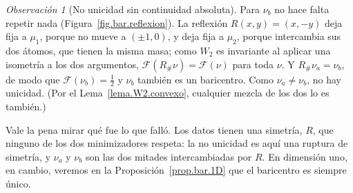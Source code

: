 \documentclass[12pt, a4paper]{amsbook}
\theoremstyle{remark}
\newtheorem{obs}[teo]{Observación}
\theoremstyle{definition}
\numberwithin{section}{chapter}
\numberwithin{subsection}{section}
\numberwithin{equation}{section}
\numberwithin{figure}{chapter}
\begin{document}
\begin{obs}[No unicidad sin continuidad absoluta]
Para $\nu_b$ no hace falta repetir nada (Figura~\ref{fig.bar.reflexion}).
La reflexión $R(x,y)=(x,-y)$ deja
fija a $\mu_1$, porque no mueve a $(\pm1,0)$, y deja fija a $\mu_2$, porque
intercambia sus dos átomos, que tienen la misma masa; como $W_2$ es
invariante al aplicar una isometría a los dos argumentos, $\mathcal F(R_\#\nu)=\mathcal F(\nu)$
para toda $\nu$. Y $R_\#\nu_a=\nu_b$, de modo que $\mathcal F(\nu_b)=\tfrac12$
y $\nu_b$ también es un baricentro. Como $\nu_a\neq\nu_b$, no hay unicidad.
(Por el Lema~\ref{lema.W2.convexo}, cualquier mezcla de los dos lo es
también.)

Vale la pena mirar qué fue lo que falló. Los datos tienen una simetría, $R$,
que ninguno de los dos minimizadores respeta: la no unicidad es aquí una
ruptura de simetría, y $\nu_a$ y $\nu_b$ son las dos mitades intercambiadas
por $R$. En dimensión uno, en cambio, veremos en la
Proposición~\ref{prop.bar.1D} que el baricentro es siempre único.
\end{obs}
\end{document}
